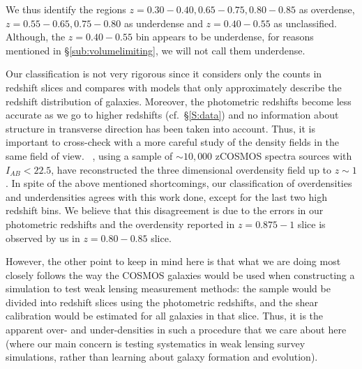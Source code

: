 \documentclass[twocolumn,useAMS,usenatbib]{mn2e}
\begin{document}

We thus identify the regions $z=0.30-0.40, 0.65-0.75, 0.80-0.85$ as overdense, $z=0.55-0.65, 0.75-0.80$ as underdense and $z=0.40-0.55$ as unclassified. Although, the $z=0.40-0.55$ bin
appears to be underdense, for reasons mentioned in \S\ref{sub:volumelimiting}, we will not call them underdense.

Our classification is not very rigorous since it considers only the counts in redshift slices and compares with models that only approximately describe the redshift distribution of galaxies.
Moreover, the photometric redshifts become less accurate as we go to higher redshifts (cf.~\S\ref{S:data}) and no information about structure in transverse direction has been taken into account.
Thus, it is important to cross-check with a more careful study of the density fields in the same field of view.
~\cite{Kovac_Density10k}, using a sample of $\sim 10,000$ zCOSMOS spectra sources with $I_{AB}<22.5$, have reconstructed the three dimensional overdensity field up to $z\sim 1$.
In spite of the above mentioned shortcomings, our classification of overdensities and underdensities agrees with this work done, except for the last two high redshift bins.
We believe that this disagreement is due to the errors in our photometric redshifts and the overdensity reported in $z=0.875-1$ slice
is observed by us in $z=0.80-0.85$ slice.

However, the other point to keep in mind here is that what we are
doing most closely follows the way the COSMOS galaxies would be used
when constructing a simulation to test weak lensing measurement
methods: the sample would be divided into redshift slices using the
photometric redshifts, and the shear calibration would be estimated
for all galaxies in that slice.  Thus, it is the apparent over- and
under-densities in such a procedure that we care about here (where our
main concern is testing systematics in weak lensing survey
simulations, rather than learning about galaxy formation and
evolution).
\end{document}
